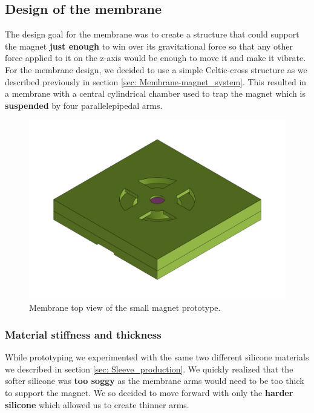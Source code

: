 \subsection{Design of the membrane}
\label{sec: Design_of_the_membrane}
The design goal for the membrane was to create a structure that could support the magnet \textbf{just enough} to win over its gravitational force so that any other force applied to it on the z-axis would be enough to move it and make it vibrate.
For the membrane design, we decided to use a simple Celtic-cross structure as we described previously in section \ref{sec: Membrane-magnet_system}.
This resulted in a membrane with a central cylindrical chamber used to trap the magnet which is \textbf{suspended} by four parallelepipedal arms.
\begin{figure}[H]
    \centering
    \includegraphics[width=0.7\linewidth]{Chapters/Chapter5/Flexible_Mat_Prototypes/Figures/membrane_v1.png}
    \caption{Membrane top view of the small magnet prototype.}
    \label{fig: Membrane_v1_model}
\end{figure}

\subsubsection{Material stiffness and thickness}
While prototyping we experimented with the same two different silicone materials we described in section \ref{sec: Sleeve_production}.
We quickly realized that the softer silicone was \textbf{too soggy} as the membrane arms would need to be too thick to support the magnet.
We so decided to move forward with only the \textbf{harder silicone} which allowed us to create thinner arms.

